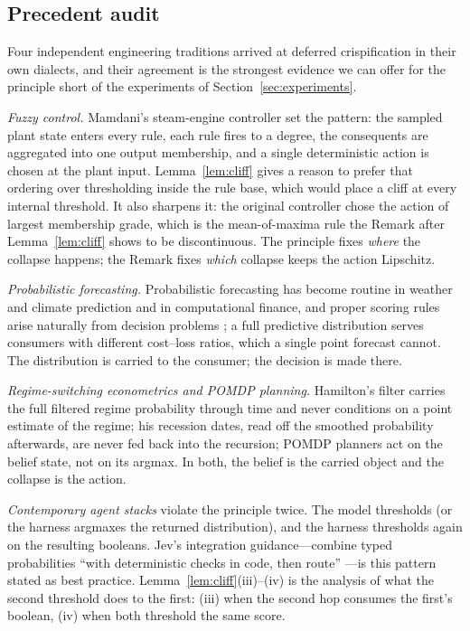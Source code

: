 \documentclass[11pt,a4paper]{article}
\numberwithin{equation}{section}
\theoremstyle{plain}
\theoremstyle{definition}
\theoremstyle{remark}
\begin{document}
\subsection{Precedent audit}

Four independent engineering traditions arrived at deferred crispification in their own dialects, and their agreement is the strongest evidence we can offer for the principle short of the experiments of Section~\ref{sec:experiments}.

\emph{Fuzzy control.} Mamdani's steam-engine controller \citep{mamdani1975} set the pattern: the sampled plant state enters every rule, each rule fires to a degree, the consequents are aggregated into one output membership, and a single deterministic action is chosen at the plant input. Lemma~\ref{lem:cliff} gives a reason to prefer that ordering over thresholding inside the rule base, which would place a cliff at every internal threshold. It also sharpens it: the original controller chose the action of largest membership grade, which is the mean-of-maxima rule the Remark after Lemma~\ref{lem:cliff} shows to be discontinuous. The principle fixes \emph{where} the collapse happens; the Remark fixes \emph{which} collapse keeps the action Lipschitz.

\emph{Probabilistic forecasting.} Probabilistic forecasting has become routine in weather and climate prediction and in computational finance, and proper scoring rules arise naturally from decision problems \citep{gneiting2007}; a full predictive distribution serves consumers with different cost--loss ratios, which a single point forecast cannot. The distribution is carried to the consumer; the decision is made there.

\emph{Regime-switching econometrics and POMDP planning.} Hamilton's filter \citep{hamilton1989} carries the full filtered regime probability through time and never conditions on a point estimate of the regime; his recession dates, read off the smoothed probability afterwards, are never fed back into the recursion; POMDP planners \citep{kaelbling1998} act on the belief state, not on its argmax. In both, the belief is the carried object and the collapse is the action.

\emph{Contemporary agent stacks} violate the principle twice. The model thresholds (or the harness argmaxes the returned distribution), and the harness thresholds again on the resulting booleans. Jev's integration guidance---combine typed probabilities ``with deterministic checks in code, then route'' \citep{typesafe2026docs}---is this pattern stated as best practice. Lemma~\ref{lem:cliff}(iii)--(iv) is the analysis of what the second threshold does to the first: (iii) when the second hop consumes the first's boolean, (iv) when both threshold the same score.
\end{document}
